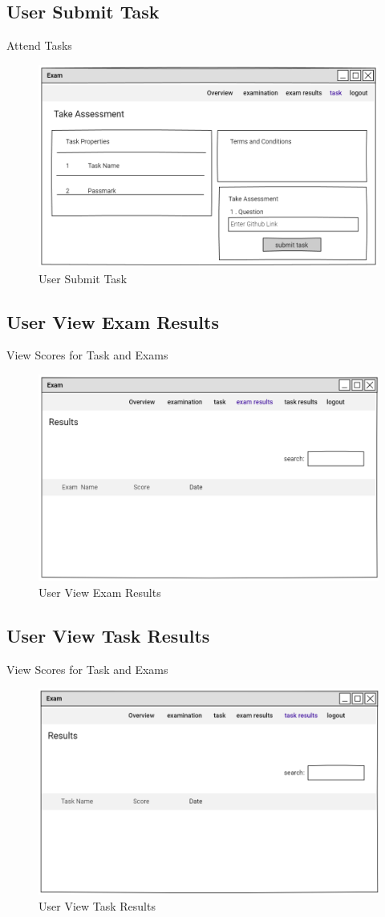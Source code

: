 \documentclass[a4paper,12pt]{report}
\begin{document}
\subsection {User Submit Task}
Attend Tasks
\begin{figure}[bph]
	\centering
	\includegraphics[width=.6\linewidth ]{img/user/takeassessment}
	\caption{User Submit Task}
\end{figure}
\pagebreak
\subsection {User View Exam Results}
View Scores for Task and Exams
\begin{figure}[bph]
	\centering
	\includegraphics[width=.6\linewidth ]{img/user/usrexmrslt}
\caption{User View Exam Results}
\end{figure}
\subsection {User View Task Results}
View Scores for Task and Exams
\begin{figure}[bph]
	\centering
	\includegraphics[width=.6\linewidth ]{img/user/usrtskrslt}
	\caption{User View Task Results}
\end{figure}
\pagebreak
\end{document}
